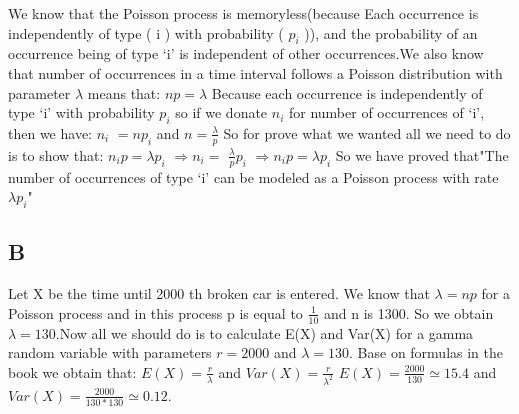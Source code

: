 \documentclass[12pt]{article}
\begin{document}
We know that the Poisson process is memoryless(because Each occurrence is
independently of type ( i ) with probability ( $p_i$ )), and the probability of
an occurrence being of type `i' is independent of other occurrences.\newline We
also know that number of occurrences in a time interval follows a Poisson
distribution with parameter $ \lambda $ means that: \newline $np=\lambda$
\newline Because each occurrence is independently of type `i' with probability
$p_i$ so if we donate $n_i$ for number of occurrences of `i', then we have:
\newline \newline $n_i$ $= n$$p_i$ and $n=\frac{\lambda}{p}$ \newline \newline
        So for prove what we wanted all we need to do is to show that:
    $n_i$$p=\lambda$$p_i$ 
\newline \newline $\Rightarrow$$n_i = $ $\frac{\lambda}{p}$$p_i$ $\Rightarrow$$n_i$$p=\lambda$$p_i$
\newline \newline So we have proved that\newline "The number of occurrences of type `i' can be modeled as a Poisson process with rate  $\lambda p_i $"

    \subsection*{B}

    Let X be the time until 2000 th broken car is entered. We know that $\lambda =
np$ for a Poisson process and in this process p is equal to $\frac{1}{10}$ and
    n is 1300. So we obtain $\lambda=130$.\newline Now all we should do is to
    calculate E(X) and Var(X) for a gamma random variable with parameters $r=2000$
    and $\lambda=130$. \newline \newline Base on formulas in the book we obtain
    that: \newline \newline $E(X)=\frac{r}{\lambda}$ and
$Var(X)=\frac{r}{\lambda^{2}}$ \newline \newline $E(X)=\frac{2000}{130}\simeq
15.4$ and $Var(X)= \frac{2000}{130*130}\simeq 0.12$.
\end{document}
